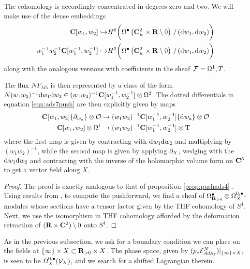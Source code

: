 \documentclass[../main.tex]{subfiles}
\begin{document}
The cohomology is accordingly concentrated in degrees zero and two. We will make use of the dense embeddings
\begin{align*}
\mathbf{C}[w_1,w_2] \hookrightarrow & H^0 \bigg( \Omega^\bullet\left(\mathbf{C}^2_w \times \mathbf{R} \setminus 0 \right) \, / \, (\mathrm{d} w_1, \mathrm{d} w_2) \bigg) \\
w_{1}^{-1} w_2^{-1} \mathbf{C}[w_1^{-1},w_2^{-1}] \hookrightarrow & H^2 \bigg( \Omega^\bullet\left(\mathbf{C}^2_w \times \mathbf{R} \setminus 0 \right) \, / \, (\mathrm{d} w_1, \mathrm{d} w_2) \bigg)
\end{align*}
along with the analogous versions with coefficients in the sheaf $\mathcal{F} = \Omega^1, T$. 

The flux $NF_{M5}$ is then represented by a class of the form $N(w_1w_2)^{-1} \mathrm{d} w_1 \mathrm{d} w_2 \in (w_1w_2)^{-1} \mathbf{C}[w_1^{-1}, w_2^{-1}]\otimes \Omega^2$. The dotted differentials in equation \ref{eqn:ads7push} are then explicitly given by maps 
\begin{align*}
\mathbf{C}[w_1,w_2]\{\partial_{w_a}\} \otimes \mathcal{O} &\to (w_1w_2)^{-1}\mathbf{C}[w_1^{-1}, w_2^{-1}] \{\mathrm{d} w_a\}\otimes \mathcal{O} \\
\mathbf{C} [w_1, w_2] \otimes \Omega^1 &\to (w_1w_2)^{-1}\mathbf{C}[w_1^{-1}, w_2^{-1}] \otimes {\mathrm{T}}  
\end{align*}
where the first map is given by contracting with $\mathrm{d} w_1 \mathrm{d} w_2$ and multiplying by $(w_1w_2)^{-1}$, while the second map is given by applying $\partial_X$, wedging with the $\mathrm{d} w_1 \mathrm{d} w_2$ and contracting with the inverse of the holomorphic volume form on $\mathbf{C}^5$ to get a vector field along $X$. 

\begin{proof}
The proof is exactly analogous to that of proposition \ref{prop:pushads4} . Using results from \cite[section 4.2]{KormanThesis}, \cite{KamberTondeur}  to compute the pushforward, we find a sheaf of $\Omega^\bullet_{\mathbf{R}_{>0}}\otimes \Omega^{0,\bullet}_{X}$-modules whose sections have a tensor factor given by the THF cohomology of $S^4$. Next, we use the isomorphism in THF cohomology afforded by the deformation retraction of $(\mathbf{R}\times \mathbf{C}^2)\setminus 0$ onto $S^4$. 
\end{proof}

\parsec{}

As in the previous subsection, we ask for a boundary condition we can place on the fields at $\{\infty\}\times X\subset \mathbf{R}_{>0}\times X$. The phase space, given by $(p_* \mathcal{E}^N_{AdS_7})|_{\{\infty\} \times X}$, is seen to be $\Omega^{0,\bullet}_{X} (\mathcal{V}_{X} )$, and we search for a shifted Lagrangian therein. 
\end{document}
